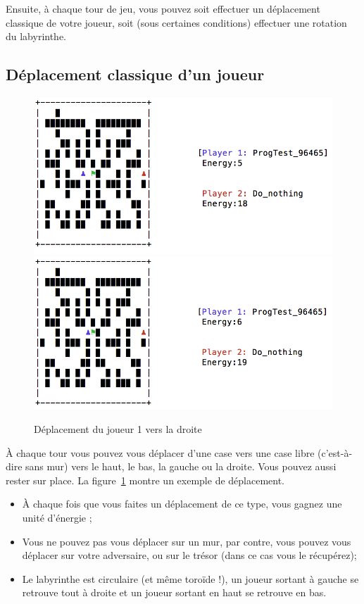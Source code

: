 \documentclass[french,12pt,a4paper,twoside,openright,titlepage]{report}
\begin{document}
Ensuite, à chaque tour de jeu, vous pouvez soit effectuer un déplacement classique de votre joueur, soit (sous certaines conditions) effectuer une rotation du labyrinthe.

\subsection{Déplacement classique d'un joueur}
\begin{figure}
\includegraphics[width=\textwidth]{laby-m2.png}\\
\includegraphics[width=\textwidth]{laby-m1.png}
\caption{\label{fig:move}Déplacement du joueur 1 vers la droite}
\end{figure}

À chaque tour vous pouvez vous déplacer d'une case vers une case libre (c'est-à-dire sans mur) vers 
le haut, le bas, la gauche ou la droite. Vous pouvez aussi rester sur place. La figure~\ref{fig:move} montre
un exemple de déplacement.
\begin{itemize}
\item À chaque fois que vous faites un déplacement de ce type, vous gagnez une unité d'énergie ;
\item Vous ne pouvez pas vous déplacer sur un mur, par contre, vous pouvez vous déplacer sur votre adversaire,
ou sur le trésor (dans ce cas vous le récupérez);
\item Le labyrinthe est circulaire (et même toroïde !), un joueur sortant à gauche se retrouve tout à droite
et un joueur sortant en haut se retrouve en bas.
\end{itemize}
\end{document}
